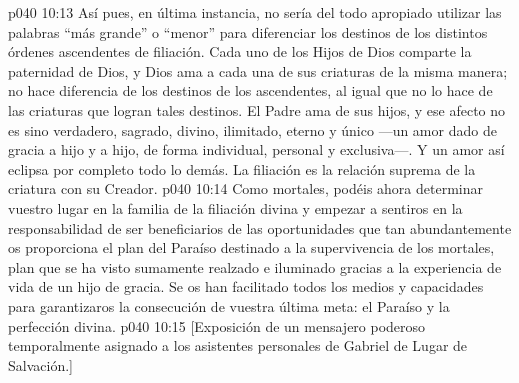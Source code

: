 \vs p040 10:13 \pc Así pues, en última instancia, no sería del todo apropiado utilizar las palabras “más grande” o “menor” para diferenciar los destinos de los distintos órdenes ascendentes de filiación. Cada uno de los Hijos de Dios comparte la paternidad de Dios, y Dios ama a cada una de sus criaturas de la misma manera; no hace diferencia de los destinos de los ascendentes, al igual que no lo hace de las criaturas que logran tales destinos. El Padre ama  de sus hijos, y ese afecto no es sino verdadero, sagrado, divino, ilimitado, eterno y único ---un amor dado de gracia a  hijo y a  hijo, de forma individual, personal y exclusiva---. Y un amor así eclipsa por completo todo lo demás. La filiación es la relación suprema de la criatura con su Creador.
\vs p040 10:14 Como mortales, podéis ahora determinar vuestro lugar en la familia de la filiación divina y empezar a sentiros en la responsabilidad de ser beneficiarios de las oportunidades que tan abundantemente os proporciona el plan del Paraíso destinado a la supervivencia de los mortales, plan que se ha visto sumamente realzado e iluminado gracias a la experiencia de vida de un hijo de gracia. Se os han facilitado todos los medios y capacidades para garantizaros la consecución de vuestra última meta: el Paraíso y la perfección divina.
\vsetoff
\vs p040 10:15 [Exposición de un mensajero poderoso temporalmente asignado a los asistentes personales de Gabriel de Lugar de Salvación.]
